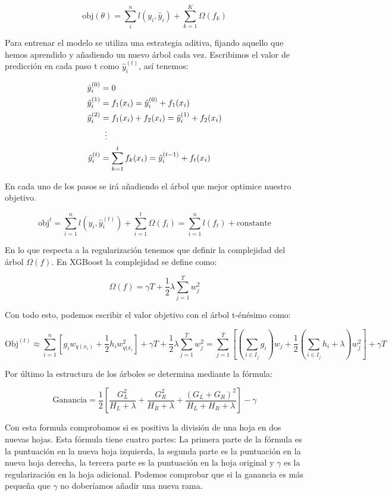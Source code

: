 \documentclass[11pt,a4paper,spanish]{article} %
\begin{document}
$$\mbox{obj} (\theta) = \sum_{i}^n l(y_i,\hat{y}_i) + \sum_{k=1}^K \Omega(f_k)$$

Para entrenar el modelo se utiliza una estrategia aditiva, fijando aquello que hemos aprendido y añadiendo un nuevo árbol cada vez. Escribimos el valor de predicción en cada paso t como $\hat{y}_i^{(t)}$, así tenemos:

\begin{align*}
\hat{y}_i^{(0)}& = 0 \\
\hat{y}_i^{(1)}& = f_1(x_i) = \hat{y}_i^{(0)} + f_1(x_i)\\
\hat{y}_i^{(2)}& = f_1(x_i) + f_2(x_i)= \hat{y}_i^{(1)} + f_2(x_i) \\
&\mathrel{\makebox[\widthof{=}]{\vdots}} \\
\hat{y}_i^{(t)}& = \sum_{k=1}^t  f_k(x_i) = \hat{y}_i^{(t-1)} + f_t(x_i) \\
\end{align*}

En cada uno de los pasos se irá añadiendo el árbol que mejor optimice nuestro objetivo. 

$$\mbox{obj}^{t} = \sum_{i=1}^n l(y_i, \hat{y}_i^{(t)}) + \sum_{i=1}^t \Omega (f_i) = \sum_{i=1}^n l(f_t) + \mbox{constante}$$

En lo que respecta a la regularización tenemos que definir la complejidad del árbol $\Omega(f)$. En XGBoost la complejidad se define como:

$$\Omega(f) = \gamma T + \frac{1}{2} \lambda \sum_{j=1}^T w^2_j$$

Con todo esto, podemos escribir el valor objetivo con el árbol t-énésimo como:

$$\mbox{Obj}^{(t)} \approx \sum_{i=1}^n[g_i w_{q(x_i)} + \frac{1}{2} h_i w^2_{q(x_i}] + \gamma T + \frac{1}{2}\lambda \sum_{j=1}^T w_j^2 = \sum_{j=1}^T[(\sum_{i \in I_j}g_i)w_j + \frac{1}{2}(\sum_{i \in I_j} h_i + \lambda) w_j^2] + \gamma T$$

Por último la estructura de los árboles se determina mediante la fórmula:

$$\mbox{Ganancia} = \frac{1}{2} \left[\frac{G^2_L}{H_L + \lambda} + \frac{G^2_R}{H_R + \lambda}+ \frac{(G_L+G_R)^2}{H_L + H_R + \lambda}\right] - \gamma $$

Con esta formula comprobamos si es positiva la división de una hoja en dos nuevas hojas. Esta fórmula tiene cuatro partes: La primera parte de la fórmula es la puntuación en la nueva hoja izquierda, la segunda parte es la puntuación en la nueva hoja derecha, la tercera parte es la puntuación en la hoja original y $\gamma$ es la regularización en la hoja adicional. Podemos comprobar que si la ganancia es más pequeña que $\gamma$ no doberíamos añadir una nueva rama.
\end{document}
